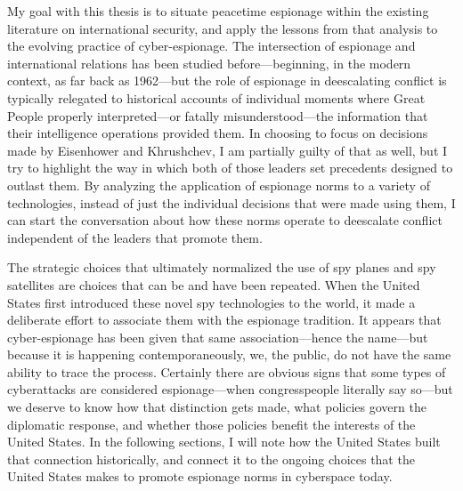 \documentclass[11pt]{memoir}
\begin{document}
My goal with this thesis is to situate peacetime espionage within the existing literature on international security, and apply the lessons from that analysis to the evolving practice of cyber-espionage. The intersection of espionage and international relations has been studied before---beginning, in the modern context, as far back as 1962---but the role of espionage in deescalating conflict is typically relegated to historical accounts of individual moments where Great People properly interpreted---or fatally misunderstood---the information that their intelligence operations provided them. In choosing to focus on decisions made by Eisenhower and Khrushchev, I am partially guilty of that as well, but I try to highlight the way in which both of those leaders set precedents designed to outlast them. By analyzing the application of espionage norms to a variety of technologies, instead of just the individual decisions that were made using them, I can start the conversation about how these norms operate to deescalate conflict independent of the leaders that promote them.

The strategic choices that ultimately normalized the use of spy planes and spy satellites are choices that can be and have been repeated. When the United States first introduced these novel spy technologies to the world, it made a deliberate effort to associate them with the espionage tradition. It appears that cyber-espionage has been given that same association---hence the name---but because it is happening contemporaneously, we, the public, do not have the same ability to trace the process. Certainly there are obvious signs that some types of cyberattacks are considered espionage---when congresspeople literally say so---but we deserve to know how that distinction gets made, what policies govern the diplomatic response, and whether those policies benefit the interests of the United States. In the following sections, I will note how the United States built that connection historically, and connect it to the ongoing choices that the United States makes to promote espionage norms in cyberspace today.
\end{document}
